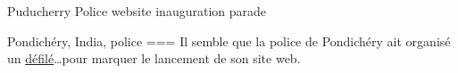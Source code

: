 Puducherry Police website inauguration parade

Pondichéry, India, police
===
Il semble que la police de Pondichéry ait organisé un \href{https://web.archive.org/web/20220816163939/https://police.py.gov.in/POLICEWEBSITEINAUGURATION/index.html}{défilé}…pour marquer le lancement de son site web.